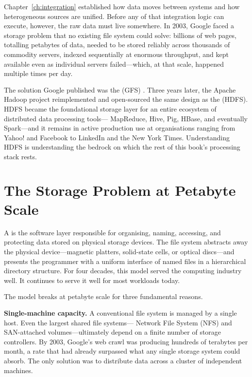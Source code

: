 \bigskip

Chapter~\ref{ch:integration} established how data moves between systems
and how heterogeneous sources are unified. Before any of that
integration logic can execute, however, the raw data must live
somewhere. In 2003, Google faced a storage problem that no existing
file system could solve: billions of web pages, totalling petabytes of
data, needed to be stored reliably across thousands of commodity
servers, indexed sequentially at enormous throughput, and kept
available even as individual servers failed---which, at that scale,
happened multiple times per day.

The solution Google published was the  (GFS)
\parencite{GFS2003}. Three years later, the Apache Hadoop project
reimplemented and open-sourced the same design as the  (HDFS). HDFS became the foundational storage
layer for an entire ecosystem of distributed data processing tools---
MapReduce, Hive, Pig, HBase, and eventually Spark---and it remains in
active production use at organisations ranging from Yahoo! and Facebook
to LinkedIn and the New York Times. Understanding HDFS is understanding
the bedrock on which the rest of this book's processing stack rests.

\section{The Storage Problem at Petabyte Scale}
\label{sec:storage-problem}

A  is the software layer responsible for organising,
naming, accessing, and protecting data stored on physical storage
devices. The file system abstracts away the physical device---magnetic
platters, solid-state cells, or optical discs---and presents the
programmer with a uniform interface of named files in a hierarchical
directory structure. For four decades, this model served the computing
industry well. It continues to serve it well for most workloads today.

The model breaks at petabyte scale for three fundamental reasons.

\textbf{Single-machine capacity.} A conventional file system is
managed by a single host. Even the largest shared file systems---
Network File System (NFS) and SAN-attached volumes---ultimately
depend on a finite number of storage controllers. By 2003, Google's
web crawl was producing hundreds of terabytes per month, a rate that
had already surpassed what any single storage system could absorb.
The only solution was to distribute data across a cluster of
independent machines.

